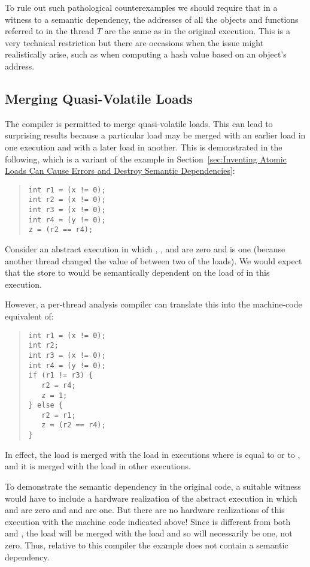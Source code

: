 To rule out such pathological counterexamples we should require that
in a witness to a semantic dependency, the addresses of all the
objects and functions referred to in the thread $T$ are the same as
in the original execution.
This is a very technical restriction but there are occasions when
the issue might realistically arise, such as when computing a hash
value based on an object's address.

\subsection{Merging Quasi-Volatile Loads}
\label{sec:Merging Quasi-Volatile Loads}

The compiler is permitted to merge quasi-volatile loads.
This can lead to surprising results because a particular load
may be merged with an earlier load in one execution and with a
later load in another.
This is demonstrated in the following, which is a variant of
the example in
Section~\ref{sec:Inventing Atomic Loads Can Cause Errors and
Destroy Semantic Dependencies}:
\begin{quote}
\begin{verbatim}
int r1 = (x != 0);
int r2 = (x != 0);
int r3 = (x != 0);
int r4 = (y != 0);
z = (r2 == r4);
\end{verbatim}
\end{quote}
Consider an abstract execution in which , , and 
are zero and  is one (because another thread changed the value
of  between two of the loads).
We would expect that the store to  would be semantically
dependent on the load of  in this execution.

However, a per-thread analysis compiler can translate this into the
machine-code equivalent of:
\begin{quote}
\begin{verbatim}
int r1 = (x != 0);
int r2;
int r3 = (x != 0);
int r4 = (y != 0);
if (r1 != r3) {
   r2 = r4;
   z = 1;
} else {
   r2 = r1;
   z = (r2 == r4);
}
\end{verbatim}
\end{quote}
In effect, the  load is merged with the  load in
executions where  is equal to  or to , and it is
merged with the  load in other executions.

To demonstrate the semantic dependency in the original code,
a suitable witness would have
to include a hardware realization of the abstract execution in which
 and  are zero and  and  are one.
But there are no hardware realizations of this execution with the
machine code indicated above!
Since  is different from both  and , the 
load will be merged with the  load and so  will
necessarily be one, not zero.
Thus, relative to this compiler the example does not contain a
semantic dependency.

